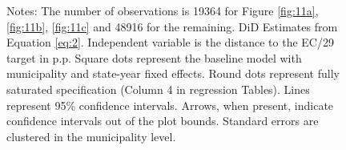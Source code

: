 \begin{figure}[h!]
\begin{center}
    \end{center}
    \scriptsize{Notes: The number of observations is 19364 for Figure \ref{fig:11a}, \ref{fig:11b}, \ref{fig:11c} and 48916 for the remaining. DiD Estimates from Equation \ref{eq:2}. Independent variable is the distance to the EC/29 target in p.p. Square dots represent the baseline model with municipality and state-year fixed effects. Round dots represent fully saturated specification (Column 4 in regression Tables). Lines represent 95\% confidence intervals. Arrows, when present, indicate confidence intervals out of the plot bounds. Standard errors are clustered in the municipality level.}
    
\end{figure}
